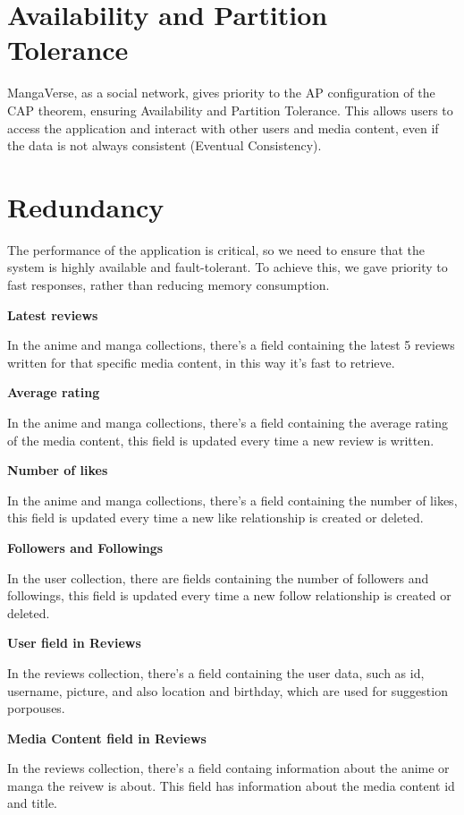 \section {Availability and Partition Tolerance}
MangaVerse, as a social network, gives priority to the AP configuration of the CAP theorem, ensuring Availability and Partition Tolerance. This allows users to access the application and interact with other users and media content, even if the data is not always consistent (Eventual Consistency).

\section{Redundancy}
The performance of the application is critical, so we need to ensure that the system is highly available and fault-tolerant. To achieve this, we gave priority to fast responses, rather than reducing memory consumption.


\textbf{Latest reviews}


In the anime and manga collections, there's a field containing the latest 5 reviews written for that specific media content, in this way it's fast to retrieve. 


\textbf{Average rating}


In the anime and manga collections, there's a field containing the average rating of the media content, this field is updated every time a new review is written.


\textbf{Number of likes}


In the anime and manga collections, there's a field containing the number of likes, this field is updated every time a new like relationship is created or deleted.


\textbf{Followers and Followings}


In the user collection, there are fields containing the number of followers and followings, this field is updated every time a new follow relationship is created or deleted.


\textbf{User field in Reviews}


In the reviews collection, there's a field containing the user data, such as id, username, picture, and also location and birthday, which are used for suggestion porpouses.

\textbf{Media Content field in Reviews}


In the reviews collection, there's a field containg information about the anime or manga the reivew is about. This field has information about the media content id and title.


